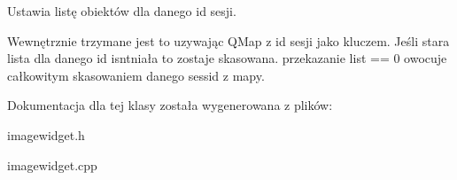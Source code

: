 Ustawia listę obiektów dla danego id sesji. 

Wewnętrznie trzymane jest to uzywając QMap z id sesji jako kluczem. Jeśli stara lista dla danego id isntniała to zostaje skasowana. przekazanie list == 0 owocuje całkowitym skasowaniem danego sessid z mapy. 

Dokumentacja dla tej klasy została wygenerowana z plików:\begin{CompactItemize}
\item 
imagewidget.h\item 
imagewidget.cpp\end{CompactItemize}
